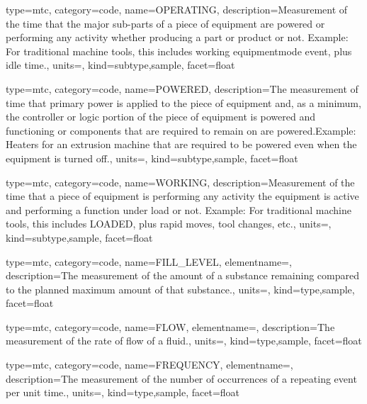{
  type=mtc,
  category=code,
  name={OPERATING},
  description={Measurement of the time that the major sub-parts of a piece of equipment are powered or performing any activity whether producing a part or product or not.   \newline Example: For traditional machine tools, this includes \gls{working equipmentmode event}, plus idle time.},
  units=,
  kind={subtype,sample},
  facet={\gls{float}}
}


{
  type=mtc,
  category=code,
  name={POWERED},
  description={The measurement of time that primary power is applied to the piece of equipment and, as a minimum, the controller or logic portion of the piece of equipment is powered and functioning or components that are required to remain on are powered.Example: Heaters for an extrusion machine that are required to be powered even when the equipment is turned off.},
  units=,
  kind={subtype,sample},
  facet={\gls{float}}
}


{
  type=mtc,
  category=code,
  name={WORKING},
  description={Measurement of the time that a piece of equipment is performing any activity  the equipment is active and performing a function under load or not. \newline Example: For traditional machine tools, this includes LOADED, plus rapid moves, tool changes, etc.},
  units=,
  kind={subtype,sample},
  facet={\gls{float}}
}


{
  type=mtc,
  category=code,
  name={FILL\_LEVEL},
  elementname=,
  description={The measurement of the amount of a substance remaining compared to the planned maximum amount of that substance.},
  units=,
  kind={type,sample},
  facet={\gls{float}}
}


{
  type=mtc,
  category=code,
  name={FLOW},
  elementname=,
  description={The measurement of the rate of flow of a fluid.},
  units=,
  kind={type,sample},
  facet={\gls{float}}
}


{
  type=mtc,
  category=code,
  name={FREQUENCY},
  elementname=,
  description={The measurement of the number of occurrences of a repeating event per unit time.},
  units=,
  kind={type,sample},
  facet={\gls{float}}
}


